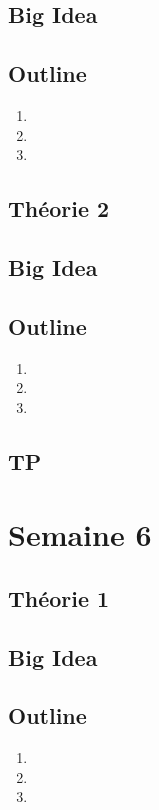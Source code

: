 \documentclass{article}
\begin{document}
\subsection*{Big Idea}
\subsection*{Outline}
    \begin{enumerate}
    \item
    \item
    \item
    \end{enumerate}
\subsection{Théorie 2}
\subsection*{Big Idea}
\subsection*{Outline}
    \begin{enumerate}
    \item
    \item
    \item
    \end{enumerate}
\subsection{TP}

\pagebreak
\section{Semaine 6}
\subsection{Théorie 1}
\subsection*{Big Idea}
\subsection*{Outline}
    \begin{enumerate}
    \item
    \item
    \item
    \end{enumerate}
\end{document}
